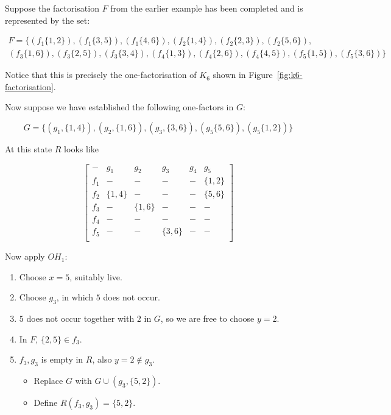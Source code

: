 \begin{example}
Suppose the factorisation $F$ from the earlier example has been completed and is represented by the set:

\begin{equation}
  \begin{split}
    F = \{(f_1\{1,2\}),(f_1\{3,5\}),(f_1\{4,6\}),(f_2\{1,4\}),(f_2\{2,3\}),(f_2\{5,6\}), \\
    (f_3\{1,6\}),(f_3\{2,5\}),(f_3\{3,4\}),(f_4\{1,3\}),(f_4\{2,6\}),(f_4\{4,5\}),(f_5\{1,5\}),(f_5\{3,6\})\}
  \end{split}
\end{equation}

Notice that this is precisely the one-factorisation of $K_6$ shown in Figure~\ref{fig:k6-factorisation}.

Now suppose we have established the following one-factors in $G$:

\begin{equation}
  G = \{(g_1, \{1, 4\}), (g_2, \{1, 6\}), (g_3, \{3, 6\}), (g_5\{5, 6\}), (g_5\{1, 2\})\}
\end{equation}

At this state $R$ looks like 

\begin{equation}
  \begin{bmatrix}
     -  &   g_1    &    g_2    &    g_3   & g_4 &    g_5    \\
    f_1 &     -    &     -     &    -     &  -  & \{1, 2\}  \\
    f_2 & \{1, 4\} &     -     &    -     &  -  & \{5, 6\}  \\
    f_3 &     -    &  \{1, 6\} &    -     &  -  &     -     \\
    f_4 &     -    &     -     &    -     &  -  &     -     \\
    f_5 &     -    &     -     & \{3, 6\} &  -  &     -     \\
  \end{bmatrix}
\end{equation}

Now apply $OH_1$:

\begin{enumerate}
  \item{Choose $x = 5$, suitably live.}
  \item{Choose $g_3$, in which $5$ does not occur.}
  \item{$5$ does not occur together with $2$ in $G$, so we are
     free to choose $y = 2$.}
  \item{In $F$, $\{2, 5\} \in f_3$.}
  \item{
    $f_3, g_3$ is empty in $R$, also $y = 2 \notin g_3$.
    \begin{itemize}
       \item{Replace $G$ with $G \cup (g_3, \{5, 2\})$.}
       \item{Define $R(f_3, g_3) = \{5, 2\}$.}
    \end{itemize}
  }
\end{enumerate}


\end{example}

